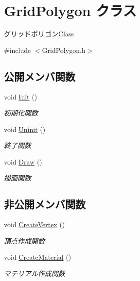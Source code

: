 \hypertarget{class_grid_polygon}{}\section{Grid\+Polygon クラス}
\label{class_grid_polygon}


グリッドポリゴン\+Class  




{\ttfamily \#include $<$Grid\+Polygon.\+h$>$}

\subsection*{公開メンバ関数}
\begin{DoxyCompactItemize}
\item 
void \mbox{\hyperlink{class_grid_polygon_a6184f3ce67a389e61ab111c5504d79a0}{Init}} ()
\begin{DoxyCompactList}\small\item\em 初期化関数 \end{DoxyCompactList}\item 
void \mbox{\hyperlink{class_grid_polygon_a85a4aa71aba9297e3bf90bd6f409b6f6}{Uninit}} ()
\begin{DoxyCompactList}\small\item\em 終了関数 \end{DoxyCompactList}\item 
void \mbox{\hyperlink{class_grid_polygon_a93a672fb9d5b6757c132fba8792f5459}{Draw}} ()
\begin{DoxyCompactList}\small\item\em 描画関数 \end{DoxyCompactList}\end{DoxyCompactItemize}
\subsection*{非公開メンバ関数}
\begin{DoxyCompactItemize}
\item 
void \mbox{\hyperlink{class_grid_polygon_a07b1e9c012d36086569860a30deb85d5}{Create\+Vertex}} ()
\begin{DoxyCompactList}\small\item\em 頂点作成関数 \end{DoxyCompactList}\item 
void \mbox{\hyperlink{class_grid_polygon_a6e9fc436896409cc4bfbf3a44d338d9b}{Create\+Material}} ()
\begin{DoxyCompactList}\small\item\em マテリアル作成関数 \end{DoxyCompactList}\end{DoxyCompactItemize}
